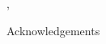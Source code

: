 \begin{titlepage}
\vfill

{\fontsize{11pt}{16.5pt}\selectfont
  \place, \submitdate
  \par
}


\newpage

\thispagestyle{empty}
\onehalfspacing

\vspace*{3cm} %

{\fontsize{11pt}{16.5pt}\selectfont
  Acknowledgements
  \par
  \acknowledgements
}

\end{titlepage}

